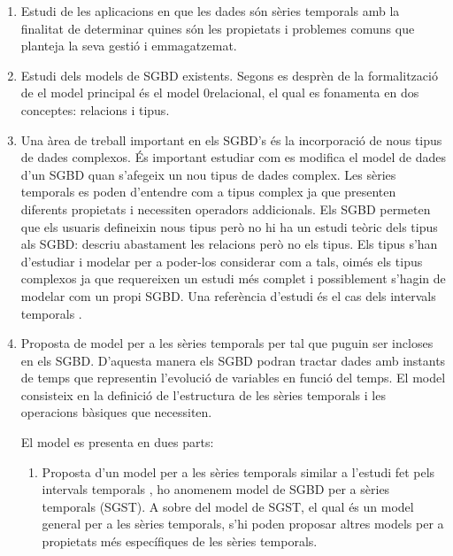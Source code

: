 \begin{enumerate}

\item Estudi de les aplicacions en que les dades són sèries temporals
  amb la finalitat de determinar quines són les propietats i problemes
  comuns que planteja la seva gestió i emmagatzemat.

\item Estudi dels models de SGBD existents. Segons es desprèn de la
  formalització de \textcite{date:introduction} el model principal és
  el model 0relacional, el qual es fonamenta en dos conceptes:
  relacions i tipus. 

\item Una àrea de treball important en els SGBD's és la incorporació
  de nous tipus de dades complexos. És important estudiar com es
  modifica el model de dades d'un SGBD quan s'afegeix un nou tipus de
  dades complex.  Les sèries temporals es poden d'entendre com a tipus
  complex ja que presenten diferents propietats i necessiten operadors
  addicionals.  Els SGBD permeten que els usuaris defineixin nous
  tipus \parencite{stonebraker86} però no hi ha un estudi teòric dels
  tipus als SGBD: \textcite{date:introduction} descriu abastament les
  relacions però no els tipus. Els tipus s'han d'estudiar i modelar
  per a poder-los considerar com a tals, oimés els tipus complexos ja
  que requereixen un estudi més complet i possiblement s'hagin de
  modelar com un propi SGBD. Una referència d'estudi és el cas dels
  intervals temporals \parencite{date02:_tempor_data_relat_model}.

\item Proposta de model per a les sèries temporals per tal que puguin
  ser incloses en els SGBD. D'aquesta manera els SGBD podran tractar
  dades amb instants de temps que representin l'evolució de variables
  en funció del temps. El model consisteix en la definició de
  l'estructura de les sèries temporals i les operacions bàsiques que
  necessiten.

  El model es presenta en dues parts:

  \begin{enumerate}
  \item Proposta d'un model per a les sèries temporals similar a
    l'estudi fet pels intervals
    temporals \parencite{date02:_tempor_data_relat_model}, ho anomenem
    model de SGBD per a sèries temporals (SGST). A sobre del model de
    SGST, el qual és un model general per a les sèries temporals, s'hi
    poden proposar altres models per a propietats més específiques de
    les sèries temporals.


\end{enumerate}
\end{enumerate}

